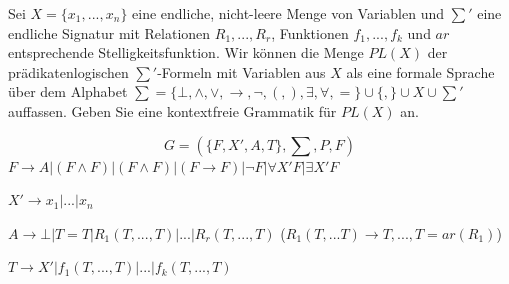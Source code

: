 \documentclass[10pt, a4paper]{exam}
\begin{document}
\begin{questions}

    \question Sei $X=\{x_1,...,x_n\}$ eine endliche, nicht-leere Menge von Variablen und $\sum'$ eine endliche Signatur mit Relationen $R_1,...,R_r$, Funktionen $f_1,...,f_k$ und $ar$ entsprechende Stelligkeitsfunktion.
    Wir können die Menge $PL(X)$ der prädikatenlogischen $\sum'$-Formeln mit Variablen aus $X$ als eine formale Sprache über dem Alphabet $\sum=\{\bot,\wedge,\vee,\rightarrow,\lnot,(,),\exists,\forall,=\}\cup\{,\}\cup X \cup \sum'$ auffassen. Geben Sie eine kontextfreie Grammatik für $PL(X)$ an.
    \begin{solution}
        $$G = (\{F, X', A, T\}, \sum, P, F)$$
        $F\rightarrow A|(F\wedge F)|(F\wedge F)|(F\rightarrow F)|\lnot F| \forall X'F | \exists X'F$

        $X'\rightarrow x_1 | ... | x_n$

        $A\rightarrow \bot | T=T | R_1(T,...,T) | ... | R_r(T,...,T)$ ($R_1(T,...T) \rightarrow T,...,T = ar(R_1)$)

        $T\rightarrow X' | f_1(T,...,T) | ... | f_k(T,...,T)$
    \end{solution}


\end{questions}
\end{document}
